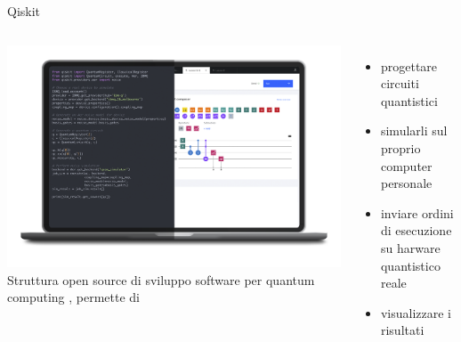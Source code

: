\documentclass{beamer}
\begin{document}
    \begin{frame}{Qiskit}
        \begin{columns}
            \includegraphics[width=\textwidth]{gfx/laptop_strumenti.png}
            Struttura open source di sviluppo software per quantum computing \cite{Qiskit}, permette di 
            \begin{itemize}
                \item progettare circuiti quantistici
                \item simularli sul proprio computer personale
                \item inviare ordini di esecuzione su harware quantistico reale
                \item visualizzare i risultati
            \end{itemize}
        \end{columns}
    \end{frame}
\end{document}
